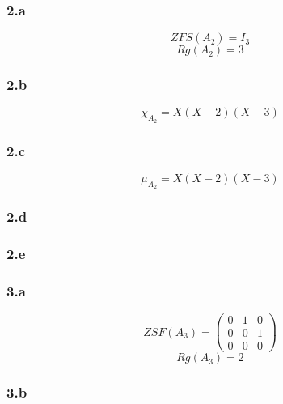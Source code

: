 \documentclass[10pt,a4paper]{article}
\begin{document}
\subsubsection*{2.a}

\begin{equation}
ZFS(A_{2}) = I_{3}
\end{equation}
\begin{equation}
Rg(A_{2}) = 3
\end{equation}

\subsubsection*{2.b}

\begin{equation}
\chi_{A_{2}} = X(X-2)(X-3)
\end{equation}

\subsubsection*{2.c}

\begin{equation}
\mu_{A_{2}} = X(X-2)(X-3)
\end{equation}

\subsubsection*{2.d}

\subsubsection*{2.e}

\subsubsection*{3.a}

\begin{equation}
ZSF(A_{3}) = 
\begin{pmatrix}
0 & 1 & 0\\
0 & 0 & 1\\
0 & 0 & 0
\end{pmatrix}
\end{equation}
\begin{equation}
Rg(A_{3}) = 2
\end{equation}

\subsubsection*{3.b}
\end{document}
